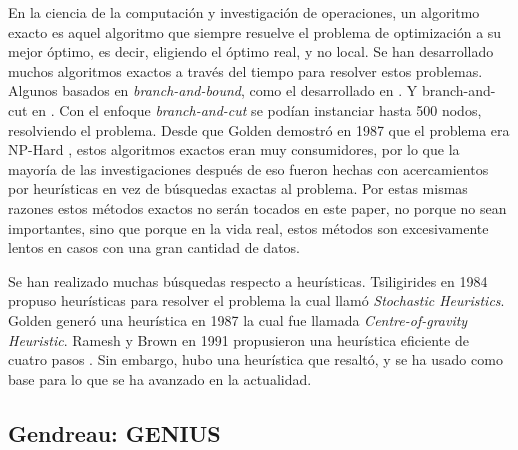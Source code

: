 \documentclass[letter, 10pt]{article}
\begin{document}
En la ciencia de la computación y investigación de operaciones, un algoritmo exacto es aquel algoritmo que siempre resuelve el problema de optimización a su mejor óptimo, es decir, eligiendo el óptimo real, y no local. Se han desarrollado muchos algoritmos exactos a través del tiempo para resolver estos problemas. Algunos basados en \textit{branch-and-bound}, como el desarrollado en \cite{ProblemaSTSP}. Y branch-and-cut en \cite{ProblemaSTSPBranchandCut}. Con el enfoque \textit{branch-and-cut} se podían instanciar hasta 500 nodos, resolviendo el problema. Desde que Golden demostró en 1987 que el problema era NP-Hard \cite{ProblemaOPNPCompHeuristic}, estos algoritmos exactos eran muy consumidores, por lo que la mayoría de las investigaciones después de eso fueron hechas con acercamientos por heurísticas en vez de búsquedas exactas al problema. Por estas mismas razones estos métodos exactos no serán tocados en este paper, no porque no sean importantes, sino que porque en la vida real, estos métodos son excesivamente lentos en casos con una gran cantidad de datos.

Se han realizado muchas búsquedas respecto a heurísticas. Tsiligirides en 1984 propuso heurísticas para resolver el problema \cite{ProblemaHeuristicaStocastica} la cual llamó \textit{Stochastic Heuristics}. Golden generó una heurística en 1987 \cite{ProblemaOPNPCompHeuristic} la cual fue llamada \textit{Centre-of-gravity Heuristic}. Ramesh y Brown en 1991 propusieron una heurística eficiente de cuatro pasos \cite{ProblemFourStep}. Sin embargo, hubo una heurística que resaltó, y se ha usado como base para lo que se ha avanzado en la actualidad.

\subsection{Gendreau: GENIUS}
\end{document}
